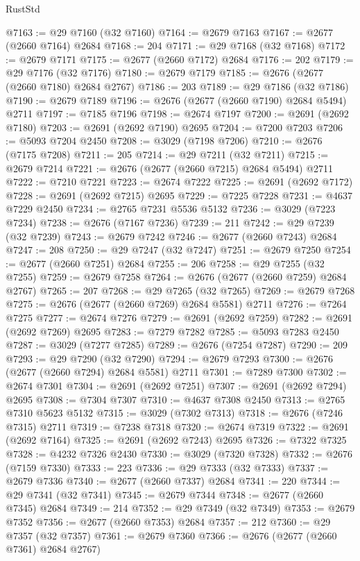 \begin{lexlean}{RustStd}
\begin{coremodule}
{\begin{coremodule}
{{{{{{{{{{{{{{{{{{{{{{{{{{{{{{{{{{{{{{{{{{{{{{{{{{{{{{{@7163 := @29 @7160 (@32 @7160)
@7164 := @2679 @7163
@7167 := @2677 (@2660 @7164) @2684
@7168 := 204
@7171 := @29 @7168 (@32 @7168)
@7172 := @2679 @7171
@7175 := @2677 (@2660 @7172) @2684
@7176 := 202
@7179 := @29 @7176 (@32 @7176)
@7180 := @2679 @7179
@7185 := @2676 (@2677 (@2660 @7180) @2684 @2767)
@7186 := 203
@7189 := @29 @7186 (@32 @7186)
@7190 := @2679 @7189
@7196 := @2676 (@2677 (@2660 @7190) @2684 @5494) @2711
@7197 := @7185 @7196
@7198 := @2674 @7197
@7200 := @2691 (@2692 @7180)
@7203 := @2691 (@2692 @7190) @2695
@7204 := @7200 @7203
@7206 := @5093 @7204 @2450
@7208 := @3029 (@7198 @7206)
@7210 := @2676 (@7175 @7208)
@7211 := 205
@7214 := @29 @7211 (@32 @7211)
@7215 := @2679 @7214
@7221 := @2676 (@2677 (@2660 @7215) @2684 @5494) @2711
@7222 := @7210 @7221
@7223 := @2674 @7222
@7225 := @2691 (@2692 @7172)
@7228 := @2691 (@2692 @7215) @2695
@7229 := @7225 @7228
@7231 := @4637 @7229 @2450
@7234 := @2765 @7231 @5536 @5132
@7236 := @3029 (@7223 @7234)
@7238 := @2676 (@7167 @7236)
@7239 := 211
@7242 := @29 @7239 (@32 @7239)
@7243 := @2679 @7242
@7246 := @2677 (@2660 @7243) @2684
@7247 := 208
@7250 := @29 @7247 (@32 @7247)
@7251 := @2679 @7250
@7254 := @2677 (@2660 @7251) @2684
@7255 := 206
@7258 := @29 @7255 (@32 @7255)
@7259 := @2679 @7258
@7264 := @2676 (@2677 (@2660 @7259) @2684 @2767)
@7265 := 207
@7268 := @29 @7265 (@32 @7265)
@7269 := @2679 @7268
@7275 := @2676 (@2677 (@2660 @7269) @2684 @5581) @2711
@7276 := @7264 @7275
@7277 := @2674 @7276
@7279 := @2691 (@2692 @7259)
@7282 := @2691 (@2692 @7269) @2695
@7283 := @7279 @7282
@7285 := @5093 @7283 @2450
@7287 := @3029 (@7277 @7285)
@7289 := @2676 (@7254 @7287)
@7290 := 209
@7293 := @29 @7290 (@32 @7290)
@7294 := @2679 @7293
@7300 := @2676 (@2677 (@2660 @7294) @2684 @5581) @2711
@7301 := @7289 @7300
@7302 := @2674 @7301
@7304 := @2691 (@2692 @7251)
@7307 := @2691 (@2692 @7294) @2695
@7308 := @7304 @7307
@7310 := @4637 @7308 @2450
@7313 := @2765 @7310 @5623 @5132
@7315 := @3029 (@7302 @7313)
@7318 := @2676 (@7246 @7315) @2711
@7319 := @7238 @7318
@7320 := @2674 @7319
@7322 := @2691 (@2692 @7164)
@7325 := @2691 (@2692 @7243) @2695
@7326 := @7322 @7325
@7328 := @4232 @7326 @2430
@7330 := @3029 (@7320 @7328)
@7332 := @2676 (@7159 @7330)
@7333 := 223
@7336 := @29 @7333 (@32 @7333)
@7337 := @2679 @7336
@7340 := @2677 (@2660 @7337) @2684
@7341 := 220
@7344 := @29 @7341 (@32 @7341)
@7345 := @2679 @7344
@7348 := @2677 (@2660 @7345) @2684
@7349 := 214
@7352 := @29 @7349 (@32 @7349)
@7353 := @2679 @7352
@7356 := @2677 (@2660 @7353) @2684
@7357 := 212
@7360 := @29 @7357 (@32 @7357)
@7361 := @2679 @7360
@7366 := @2676 (@2677 (@2660 @7361) @2684 @2767)
}}}}}}}}}}}}}}}}}}}}}}}}}}}}}}}}}}}}}}}}}}}}}}}}}}}}}}}
\end{coremodule}}
\end{coremodule}
\end{lexlean}
